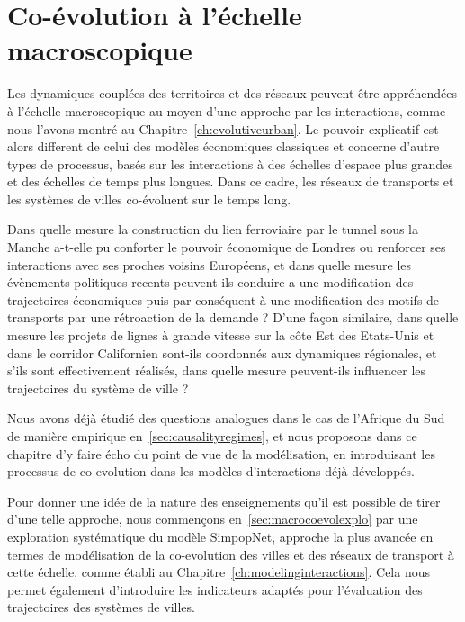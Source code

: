 
\chapter{Co-évolution à l'échelle macroscopique}


\label{ch:macrocoevolution} 



Les dynamiques couplées des territoires et des réseaux peuvent être appréhendées à l'échelle macroscopique au moyen d'une approche par les interactions, comme nous l'avons montré au Chapitre~\ref{ch:evolutiveurban}. Le pouvoir explicatif est alors different de celui des modèles économiques classiques et concerne d'autre types de processus, basés sur les interactions à des échelles d'espace plus grandes et des échelles de temps plus longues. Dans ce cadre, les réseaux de transports et les systèmes de villes co-évoluent sur le temps long.


Dans quelle mesure la construction du lien ferroviaire par le tunnel sous la Manche a-t-elle pu conforter le pouvoir économique de Londres ou renforcer ses interactions avec ses proches voisins Européens, et dans quelle mesure les évènements politiques recents peuvent-ils conduire a une modification des trajectoires économiques puis par conséquent à une modification des motifs de transports par une rétroaction de la demande ? D'une façon similaire, dans quelle mesure les projets de lignes à grande vitesse sur la côte Est des Etats-Unis et dans le corridor Californien sont-ils coordonnés aux dynamiques régionales, et s'ils sont effectivement réalisés, dans quelle mesure peuvent-ils influencer les trajectoires du système de ville ?


Nous avons déjà étudié des questions analogues dans le cas de l'Afrique du Sud de manière empirique en~\ref{sec:causalityregimes}, et nous proposons dans ce chapitre d'y faire écho du point de vue de la modélisation, en introduisant les processus de co-evolution dans les modèles d'interactions déjà développés.


Pour donner une idée de la nature des enseignements qu'il est possible de tirer d'une telle approche, nous commençons en~\ref{sec:macrocoevolexplo} par une exploration systématique du modèle SimpopNet, approche la plus avancée en termes de modélisation de la co-evolution des villes et des réseaux de transport à cette échelle, comme établi au Chapitre~\ref{ch:modelinginteractions}. Cela nous permet également d'introduire les indicateurs adaptés pour l'évaluation des trajectoires des systèmes de villes.


